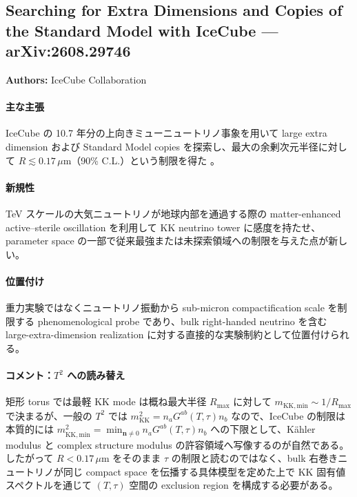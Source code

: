 \subsection{Searching for Extra Dimensions and Copies of the Standard Model with IceCube --- arXiv:2608.29746}

\textbf{Authors:} IceCube Collaboration

\paragraph{主な主張}
IceCube の 10.7 年分の上向きミューニュートリノ事象を用いて large extra dimension および Standard Model copies を探索し、最大の余剰次元半径に対して $R\lesssim 0.17\,\mu\mathrm{m}$（90\% C.L.）という制限を得た \cite{IceCube:2026extra}。

\paragraph{新規性}
TeV スケールの大気ニュートリノが地球内部を通過する際の matter-enhanced active--sterile oscillation を利用して KK neutrino tower に感度を持たせ、parameter space の一部で従来最強または未探索領域への制限を与えた点が新しい。

\paragraph{位置付け}
重力実験ではなくニュートリノ振動から sub-micron compactification scale を制限する phenomenological probe であり、bulk right-handed neutrino を含む large-extra-dimension realization に対する直接的な実験制約として位置付けられる。

\paragraph{コメント：$T^2$ への読み替え}
矩形 torus では最軽 KK mode は概ね最大半径 $R_{\max}$ に対して $m_{\mathrm{KK,min}}\sim 1/R_{\max}$ で決まるが、一般の $T^2$ では $m_{\mathrm{KK}}^2=n_a G^{ab}(T,\tau)n_b$ なので、IceCube の制限は本質的には $m_{\mathrm{KK,min}}^2=\min_{\mathbf n\neq0}n_aG^{ab}(T,\tau)n_b$ への下限として、K\"ahler modulus と complex structure modulus の許容領域へ写像するのが自然である。したがって $R<0.17\,\mu\mathrm{m}$ をそのまま $\tau$ の制限と読むのではなく、bulk 右巻きニュートリノが同じ compact space を伝播する具体模型を定めた上で KK 固有値スペクトルを通じて $(T,\tau)$ 空間の exclusion region を構成する必要がある。
